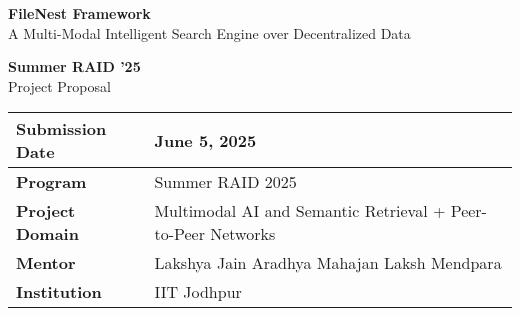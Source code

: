 \documentclass[11pt,a4paper]{article}
\begin{document}
\begin{titlepage}
\centering

    \begin{center}


    \end{center}

\vspace*{1cm}
{\huge\color{blue!80!black} \textbf{FileNest Framework}}\\[0.3cm]
{\Large A Multi-Modal Intelligent Search Engine over Decentralized Data
}\\[0.2cm]

\vspace*{2cm}

{\huge\bfseries Summer RAID '25}\\[0.5cm]
{\large Project Proposal}\\[1.5cm]
\vspace*{1cm}



{\large
\begin{tabular}{|l|l|}
\hline
\textbf{Submission Date} & June 5, 2025 \\
\hline
\textbf{Program} & Summer RAID 2025 \\
\hline
\textbf{Project Domain} &  Multimodal AI and Semantic Retrieval + Peer-to-Peer Networks\\
\hline
\textbf{Mentor} & {Lakshya Jain  \textbar{} Aradhya Mahajan \textbar{} Laksh Mendpara} \\
\hline
\textbf{Institution} & IIT Jodhpur \\
\hline
\end{tabular}
}


\end{titlepage}
\end{document}
